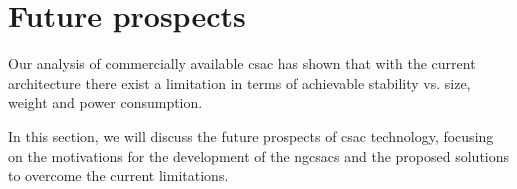 \section{Future prospects}
\label{sec:future_prospects}

Our analysis of commercially available \acrshort{csac} has shown that with the current architecture there exist a limitation in terms of achievable stability vs. size, weight and power consumption.

In this section, we will discuss the future prospects of \acrshort{csac} technology, focusing on the motivations for the development of the \acrfull{ngcsacs} and the proposed solutions to overcome the current limitations.




